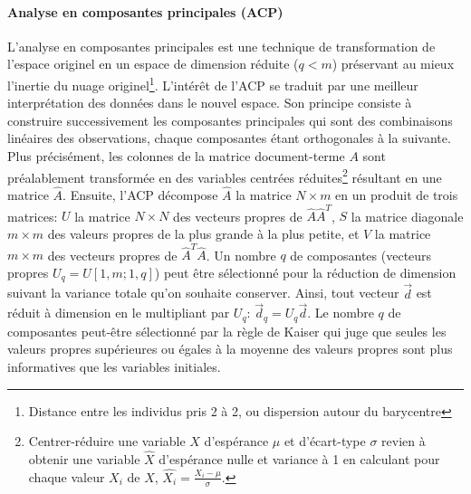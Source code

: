 \paragraph[PCA]{Analyse en composantes principales (ACP)}
L'analyse en composantes principales \citep{burrows1992PCA} est une technique de transformation de l'espace originel en un espace de dimension réduite ($q < m$)  préservant au mieux l'inertie du nuage originel\footnote{Distance entre les individus pris 2 à 2, ou dispersion autour du barycentre}. L'intérêt de l'ACP se traduit par une meilleur interprétation des données dans le nouvel espace. Son principe consiste à construire successivement les composantes principales qui sont des combinaisons linéaires des observations, chaque composantes étant orthogonales à la suivante. Plus précisément, les colonnes de la matrice document-terme $A$ sont préalablement transformée en des variables centrées réduites\footnote{Centrer-réduire une variable $X$ d'espérance $\mu$ et d'écart-type $\sigma$ revien à obtenir une variable  $\hat{X}$ d'espérance nulle et variance à 1 en calculant pour chaque valeur $X_i$ de $X$, $\hat{X_i} = \frac{X_i-\mu}{\sigma}$.} résultant en une matrice $\hat{A}$. Ensuite, l'ACP décompose $\hat{A}$ la matrice $N\times m$ en un produit de trois matrices: $U$ la matrice $N \times N$  des vecteurs propres de $\hat{A}\hat{A}^T$, $S$ la matrice diagonale $m\times m$  des valeurs propres de la plus grande à la plus petite, et $V$ la matrice $m\times m$  des vecteurs propres de $\hat{A}^T\hat{A}$. Un nombre $q$ de composantes (vecteurs propres $U_q = U[1,m;1,q]$) peut être sélectionné pour la réduction de dimension suivant la variance totale qu'on souhaite conserver. Ainsi, tout vecteur $\vec{d}$ est réduit à dimension en le multipliant par $U_q$: $\vec{d}_q = U_q\vec{d}$.
Le nombre $q$ de composantes peut-être sélectionné par la règle de Kaiser qui juge que seules les valeurs propres supérieures ou égales à la moyenne des valeurs propres sont plus informatives que les variables initiales. %

